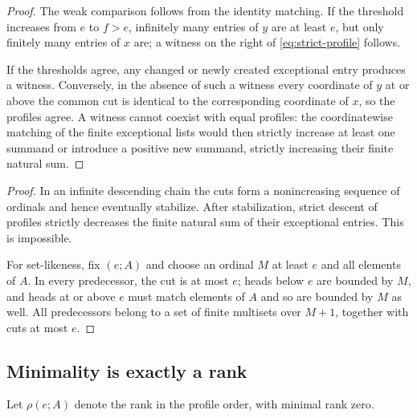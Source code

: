 \documentclass[11pt,a4paper]{article}
\newtheorem{lemma}[theorem]{Lemma}
\theoremstyle{definition}
\newcommand{\tail}{\varepsilon}
\newcommand{\prof}{\operatorname{prof}}
\begin{document}
\begin{proof}
The weak comparison follows from the identity matching. If the threshold
increases from $e$ to $f>e$, infinitely many entries of $y$ are at least $e$,
but only finitely many entries of $x$ are; a witness on the right of
\eqref{eq:strict-profile} follows.

If the thresholds agree, any changed or newly created exceptional entry
produces a witness. Conversely, in the absence of such a witness every
coordinate of $y$ at or above the common cut is identical to the corresponding
coordinate of $x$, so the profiles agree. A witness cannot coexist with equal
profiles: the coordinatewise matching of the finite exceptional lists would
then strictly increase at least one summand or introduce a positive new
summand, strictly increasing their finite natural sum.
\end{proof}

\begin{proof}
In an infinite descending chain the cuts form a nonincreasing sequence of
ordinals and hence eventually stabilize. After stabilization, strict descent
of profiles strictly decreases the finite natural sum of their exceptional
entries. This is impossible.

For set-likeness, fix $(e;A)$ and choose an ordinal $M$ at least $e$ and
all elements of $A$. In every predecessor, the cut is at most $e$; heads
below $e$ are bounded by $M$, and heads at or above $e$ must match elements
of $A$ and so are bounded by $M$ as well. All predecessors belong to a set
of finite multisets over $M+1$, together with cuts at most $e$.
\end{proof}

\subsection{Minimality is exactly a rank}
Let $\rho(e;A)$ denote the rank in the profile order, with minimal rank zero.
\end{document}
